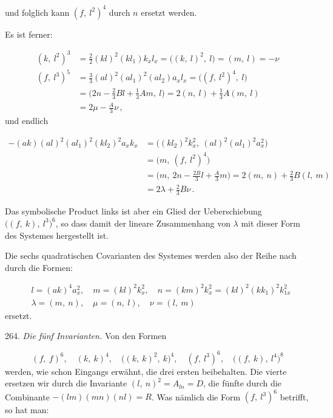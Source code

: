 und folglich kann $(f,\ l^2)^4$ durch $n$ ersetzt werden.

Es ist ferner:

\[
\begin{aligned}
(k,\ l^2)^3 &= \frac{2}{2} (kl)^2(kl_1)k_xl_x = \big((k,\ l)^2,\ l\big) = (m,\ l) = -\nu\\[4pt]
(f,\ l^3)^5 &= \frac{3}{3} (al)^2(al_1)^2(al_2)a_xl_x = \big((f,\ l^2)^4,\ l\big)\\
&= \Big(2n-\frac{2}{3}Bl+\frac{1}{3}Am,\ l\Big) = 2(n,\ l)+\frac{1}{3}A(m,\ l)\\
&= 2\mu-\frac{A}{3}\nu\,,
\end{aligned}
\]
und endlich

\[
\begin{aligned}
-(ak)(al)^2(al_1)^2(kl_2)^2a_xk_x &= \big((kl_2)^2k_x^2,\ (al)^2(al_1)^2a_x^2\big)\\
&= \big(m,\ (f,\ l^2)^4\big)\\
&= \Big(m,\ 2n-\frac{2B}{3}l+\frac{A}{3}m\Big) = 2(m,\ n)+\frac{2}{3}B(l,\ m)\\
&= 2\lambda+\frac{2}{3}B\nu\,.
\end{aligned}
\]

Das symbolische Product links ist aber ein Glied der Ueberschiebung
$\big((f,\ k),\ l^3\big)^6$, so dass damit der lineare Zusammenhang von $\lambda$
mit dieser Form des Systemes hergestellt ist.

Die sechs quadratischen Covarianten des Systemes werden also der Reihe nach
durch die Formen:

\[
\begin{aligned}
&l = (ak)^4a_x^2, \quad m = (kl)^2k_x^2, \quad n = (km)^2k_x^2 = (kl)^2(kk_1)^2k_{1x}^2\\
&\lambda = (m,\ n), \quad \mu = (n,\ l), \quad \nu = (l,\ m)
\end{aligned}
\]
ersetzt.



264. \textit{Die fünf Invarianten.} Von den Formen

\[
(f,\ f)^6,\quad (k,\ k)^4,\quad \big((k,\ k)^2,\ k\big)^4,\quad (f,\ l^3)^6,\quad \big((f,\ k),\ l^4\big)^8
\]
werden, wie schon Eingangs erwähnt, die drei ersten beibehalten. Die vierte
ersetzen wir durch die Invariante $(l,\ n)^2 = A_{ln} = D$, die fünfte durch
die Combinante $-(lm)(mn)(nl) = R$. Was nämlich die Form $(f,\ l^3)^6$
betrifft, so hat man:


